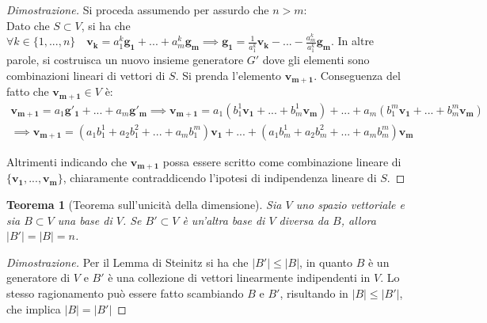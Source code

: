 \documentclass{article}
\newtheorem{theorem}{Teorema}
\begin{document}
    \begin{proof}[Dimostrazione] Si proceda assumendo per assurdo che $n > m$: \\
        Dato che $S \subset V$, si ha che $\forall k \in \{1, ..., n\} \quad \mathbf{v_k} = a_{1}^{k}\mathbf{g_1} + ... + a_{m}^{k}\mathbf{g_m} \implies \mathbf{g_1} = \frac{1}{a_{1}^{k}}\mathbf{v_k} - ... - \frac{a_{m}^{k}}{a_{1}^{k}}\mathbf{g_m}$. In altre parole, si costruisca un nuovo insieme generatore
        $G'$ dove gli elementi sono combinazioni lineari di vettori di $S$. Si prenda l'elemento $\mathbf{v_{m+1}}$. Conseguenza del fatto che $\mathbf{v_{m+1}} \in V$ è: 
        \[
            \begin{array}{c}
                \mathbf{v_{m+1}} = a_1\mathbf{g'_{1}} + ... + a_m\mathbf{g'_{m}} \implies 
                \mathbf{v_{m+1}} = a_1(b_{1}^{1}\mathbf{v_1} + ... + b_{m}^{1}\mathbf{v_m}) + ... + a_m(b_{1}^{m}\mathbf{v_1} + ... + b_{m}^{m}\mathbf{v_m}) \\ [1em]
                \implies \mathbf{v_{m+1}} = (a_1 b_{1}^{1} + a_2 b_{1}^{2} + ... + a_m b_{1}^{m})\mathbf{v_1} + ... + (a_1 b_{m}^{1} + a_2 b_{m}^{2} + ... + a_m b_{m}^{m})\mathbf{v_m}
            \end{array}
        \]

        Altrimenti indicando che $\mathbf{v_{m+1}}$ possa essere scritto come combinazione lineare di $\{\mathbf{v_1}, ..., \mathbf{v_m}\}$, chiaramente contraddicendo l'ipotesi di indipendenza lineare di $S$.
    \end{proof}
    
    \vspace{10pt}
    \begin{theorem}[Teorema sull'unicità della dimensione]
        Sia $V$ uno spazio vettoriale e sia $B \subset V$ una base di $V$. Se $B' \subset V$ è un'altra base di $V$ diversa da $B$, allora $|B'| = |B| = n$.
    \end{theorem}

    \begin{proof}[Dimostrazione]
       Per il Lemma di Steinitz si ha che $|B'| \leq |B|$, in quanto $B$ è un generatore di $V$ e $B'$ è una collezione di vettori linearmente indipendenti in $V$.
       Lo stesso ragionamento può essere fatto scambiando $B$ e $B'$, risultando in $|B| \leq |B'|$, che implica $|B| = |B'|$
    \end{proof}




\vspace{10pt}
\end{document}
